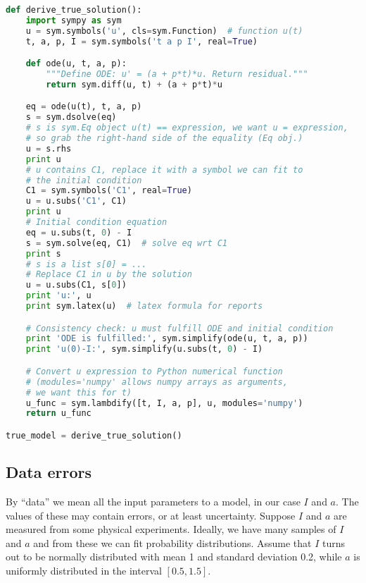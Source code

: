 \documentclass[graybox,sectrefs,envcountresetchap,open=right,final]{svmonodo}
\begin{document}
\begin{lstlisting}[language=Python,style=blue1_bluegreen]
def derive_true_solution():
    import sympy as sym
    u = sym.symbols('u', cls=sym.Function)  # function u(t)
    t, a, p, I = sym.symbols('t a p I', real=True)

    def ode(u, t, a, p):
        """Define ODE: u' = (a + p*t)*u. Return residual."""
        return sym.diff(u, t) + (a + p*t)*u

    eq = ode(u(t), t, a, p)
    s = sym.dsolve(eq)
    # s is sym.Eq object u(t) == expression, we want u = expression,
    # so grab the right-hand side of the equality (Eq obj.)
    u = s.rhs
    print u
    # u contains C1, replace it with a symbol we can fit to
    # the initial condition
    C1 = sym.symbols('C1', real=True)
    u = u.subs('C1', C1)
    print u
    # Initial condition equation
    eq = u.subs(t, 0) - I
    s = sym.solve(eq, C1)  # solve eq wrt C1
    print s
    # s is a list s[0] = ...
    # Replace C1 in u by the solution
    u = u.subs(C1, s[0])
    print 'u:', u
    print sym.latex(u)  # latex formula for reports

    # Consistency check: u must fulfill ODE and initial condition
    print 'ODE is fulfilled:', sym.simplify(ode(u, t, a, p))
    print 'u(0)-I:', sym.simplify(u.subs(t, 0) - I)

    # Convert u expression to Python numerical function
    # (modules='numpy' allows numpy arrays as arguments,
    # we want this for t)
    u_func = sym.lambdify([t, I, a, p], u, modules='numpy')
    return u_func

true_model = derive_true_solution()
\end{lstlisting}

\subsection{Data errors}

By ``data'' we mean all the input parameters to a model, in our case
$I$ and $a$. The values of these may contain errors, or at least
uncertainty. Suppose $I$ and $a$ are measured from some physical
experiments. Ideally, we have many samples of $I$ and $a$ and
from these we can fit probability distributions. Assume that $I$
turns out to be normally distributed with mean 1 and standard deviation 0.2,
while $a$ is uniformly distributed in the interval $[0.5, 1.5]$.

\end{document}
